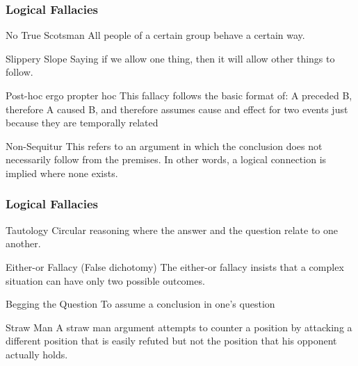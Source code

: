\documentclass{beamer}
\begin{document}
\begin{frame}
\frametitle{Logical Fallacies}
\begin{block}{No True Scotsman}
All people of a certain group behave a certain way. 
\end{block}

\begin{block}{Slippery Slope}
Saying if we allow one thing, then it will allow other things to follow. 
\end{block}

\begin{block}{Post-hoc ergo propter hoc}
This fallacy follows the basic format of: A preceded B, therefore A caused B, and therefore assumes cause and effect for two events just because they are temporally related
\end{block}

\begin{block}{Non-Sequitur}
 This refers to an argument in which the conclusion does not necessarily follow from the premises. In other words, a logical connection is implied where none exists. 
\end{block}
\end{frame}
\begin{frame}
\frametitle{Logical Fallacies}
\begin{block}{Tautology}
Circular reasoning where the answer and the question relate to one another. 
\end{block}

\begin{block}{Either-or Fallacy (False dichotomy)}
The either-or fallacy insists that a complex situation can have only two possible outcomes.
\end{block}

\begin{block}{Begging the Question}
To assume a conclusion in one's question
\end{block}

\begin{block}{Straw Man}
A straw man argument attempts to counter a position by attacking a different position that is easily refuted but not the position that his opponent actually holds. 
\end{block}
\end{frame}
\end{document}

